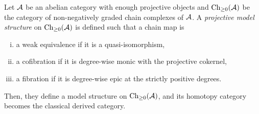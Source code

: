 \documentclass{../../large}
\begin{document}
\begin{prb}
Let $\mathcal{A}$ be an abelian category with enough projective objects and $\operatorname{Ch}_{\ge0}(\mathcal{A})$ be the category of non-negatively graded chain complexes of $\mathcal{A}$.
A \emph{projective model structure} on $\operatorname{Ch}_{\ge0}(\mathcal{A})$ is defined such that a chain map is 
\begin{enumerate}[(i)]
\item a weak equivalence if it is a quasi-isomorphism,
\item a cofibration if it is degree-wise monic with the projective cokernel,
\item a fibration if it is degree-wise epic at the strictly positive degrees.
\end{enumerate}
Then, they define a model structure on $\operatorname{Ch}_{\ge0}(\mathcal{A})$, and its homotopy category becomes the classical derived category.
\end{prb}
\end{document}
